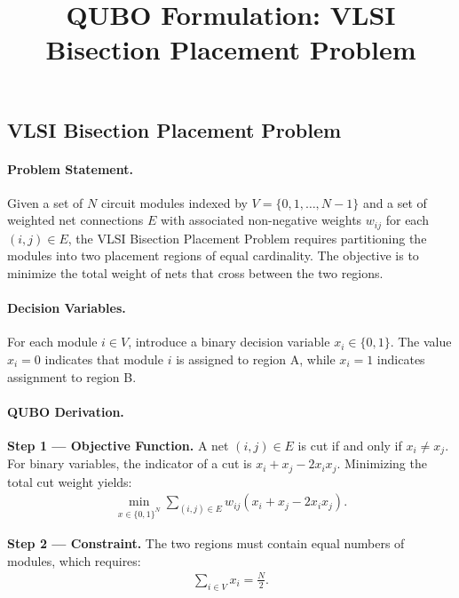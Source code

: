 \documentclass[12pt]{article}
\title{QUBO Formulation: VLSI Bisection Placement Problem}
\date{}
\begin{document}
\maketitle

\subsection*{VLSI Bisection Placement Problem}

\paragraph{Problem Statement.}
Given a set of $N$ circuit modules indexed by $V = \{0, 1, \dots, N-1\}$ and a set of weighted net connections $E$ with associated non-negative weights $w_{ij}$ for each $(i,j) \in E$, the VLSI Bisection Placement Problem requires partitioning the modules into two placement regions of equal cardinality. The objective is to minimize the total weight of nets that cross between the two regions.

\paragraph{Decision Variables.}
For each module $i \in V$, introduce a binary decision variable $x_i \in \{0, 1\}$. The value $x_i = 0$ indicates that module $i$ is assigned to region A, while $x_i = 1$ indicates assignment to region B.

\paragraph{QUBO Derivation.}
\textbf{Step 1 --- Objective Function.} A net $(i,j) \in E$ is cut if and only if $x_i \neq x_j$. For binary variables, the indicator of a cut is $x_i + x_j - 2x_i x_j$. Minimizing the total cut weight yields:
\begin{align}
\min_{x \in \{0,1\}^N} \sum_{(i,j) \in E} w_{ij} (x_i + x_j - 2x_i x_j).
\end{align}

\textbf{Step 2 --- Constraint.} The two regions must contain equal numbers of modules, which requires:
\begin{align}
\sum_{i \in V} x_i = \frac{N}{2}.
\end{align}
\end{document}
